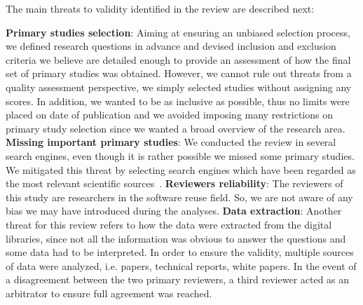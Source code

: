 The main threats to validity identified in the review are described next:

\textbf{Primary studies selection}: Aiming at ensuring an unbiased selection process, we defined research questions in advance and devised inclusion and exclusion criteria we believe are detailed enough to provide an assessment of how the final set of primary studies was obtained. However, we cannot rule out threats from a quality assessment perspective, we simply selected studies without assigning any scores. In addition, we wanted to be as inclusive as possible, thus no limits were placed on date of publication and we avoided imposing many restrictions on primary study selection since we wanted a broad overview of the research area. \textbf{Missing important primary studies}: We conducted the review in several search engines, even though it is rather possible we missed some primary studies. We mitigated this threat by selecting search engines which have been regarded as the most relevant scientific sources~\cite{Kitchenham}. \textbf{Reviewers reliability}: The reviewers of this study are researchers in the software reuse field. So, we are not aware of any bias we may have introduced during the analyses. \textbf{Data extraction}: Another threat for this review refers to how the data were extracted from the digital libraries, since not all the information was obvious to answer the questions and some data had to be interpreted. In order to ensure the validity, multiple sources of data were analyzed, i.e. papers, technical reports, white papers. In the event of a disagreement between the two primary reviewers, a third reviewer acted as an arbitrator to ensure full agreement was reached.
